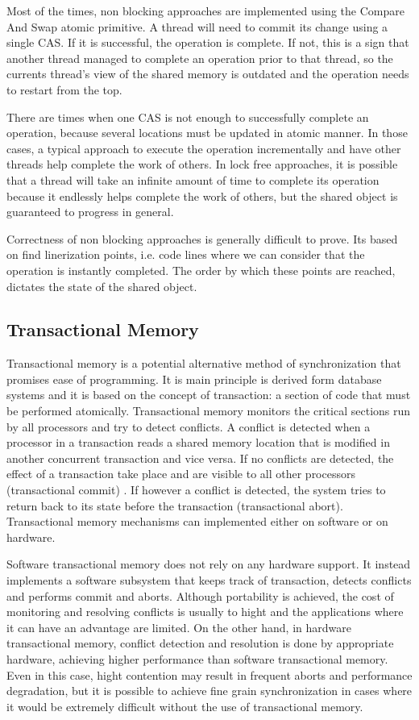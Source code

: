 Most of the times, non blocking approaches are implemented using the Compare And Swap atomic primitive. A thread will need to commit its change using a single CAS. If it is successful, the operation is complete. If not, this is a sign that another thread managed to complete an operation prior to that thread, so the currents thread's view of the shared memory is outdated and the operation needs to restart from the top.

There are times when one CAS is not enough to successfully complete an operation, because several locations must be updated in atomic manner. In those cases, a typical approach to execute the operation  incrementally and have other threads help complete the work of others. In lock free approaches, it is possible that a thread will take an infinite amount of time to complete its operation because it endlessly helps complete the work of others, but the shared object is guaranteed to progress in general.

Correctness of non blocking approaches is  generally difficult to prove. Its based on find linerization points, i.e. code lines where we can consider that the operation is instantly completed. The order by which these points are reached, dictates the state of the shared object.

\subsection{Transactional Memory}

Transactional memory is a potential alternative method of synchronization that promises ease of programming. It is main principle is derived form database systems and it is based on the concept of transaction: a section of code that must be performed atomically. Transactional memory monitors the critical sections run by all processors and try to detect conflicts. A conflict is detected when a processor in a transaction reads a shared memory location that is modified in another concurrent transaction and vice versa. If no conflicts are detected, the effect of a transaction take place and are visible to all other processors (transactional commit) . If however a conflict is detected, the system tries to return back to its state before the transaction (transactional abort). Transactional memory mechanisms can implemented either on software or on hardware.

Software transactional memory does not rely on any hardware support. It instead implements a software subsystem that keeps track of transaction, detects conflicts and performs commit and aborts. Although portability is achieved, the cost of monitoring and resolving conflicts is usually to hight and the applications where it can have an advantage are limited. On the other hand, in hardware transactional memory, conflict detection and resolution is done by appropriate hardware, achieving higher performance than software transactional memory. Even in this case, hight contention may result in frequent aborts and performance degradation, but it is possible to achieve fine grain synchronization in cases where it would be extremely difficult without the use of transactional memory. 


